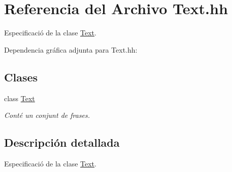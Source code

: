 \hypertarget{_text_8hh}{}\section{Referencia del Archivo Text.\+hh}
\label{_text_8hh}


Especificació de la clase \hyperlink{class_text}{Text}.  


Dependencia gráfica adjunta para Text.\+hh\+:
\subsection*{Clases}
\begin{DoxyCompactItemize}
\item 
class \hyperlink{class_text}{Text}
\begin{DoxyCompactList}\small\item\em Conté un conjunt de frases. \end{DoxyCompactList}\end{DoxyCompactItemize}


\subsection{Descripción detallada}
Especificació de la clase \hyperlink{class_text}{Text}. 

